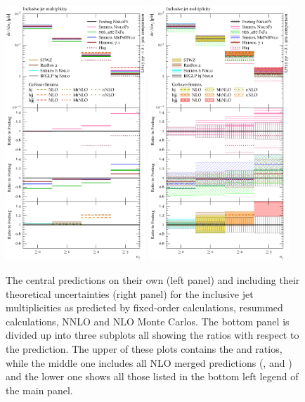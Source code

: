 \begin{figure}[t!]
  \centering
  \includegraphics[width=0.47\textwidth]{figures/hjetscomp_u_NJet_incl_30.pdf}
  \hfill
  \includegraphics[width=0.47\textwidth]{figures/hjetscomp_NJet_incl_30.pdf}
  \caption{\label{fig:hjetscomp:results:inclobs:njets}%
    The central predictions on their own (left panel) and including their
    theoretical uncertainties (right panel) for the inclusive jet
    multiplicities as predicted by fixed-order calculations, resummed
    calculations, NNLO and NLO Monte Carlos. The bottom panel is
    divided up into three subplots all showing the ratios with respect
    to the \hjetscompPowheg \hjetscompNNLOPS prediction. The upper of these plots
    contains the \hjetscompHej and \hjetscompSherpa \hjetscompNNLOPS ratios, while the middle one
    includes all NLO merged predictions (\hjetscompMGaMC, \hjetscompHerwig and \hjetscompSherpa)
    and the lower one shows all those listed in the bottom left legend
    of the main panel.}
\end{figure}

